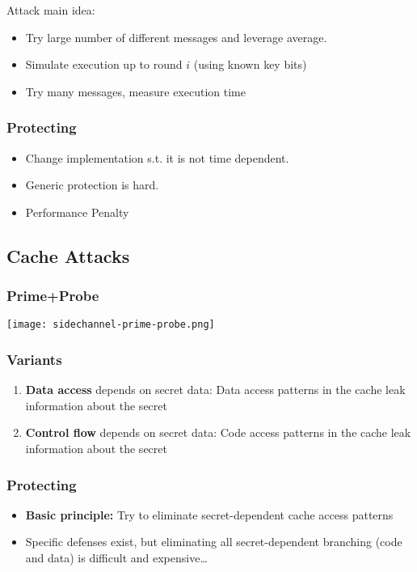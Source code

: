 Attack main idea:
\begin{itemize}
  \item Try large number of different messages and leverage average.
  \item Simulate execution up to round $i$ (using known key bits)
  \item Try many messages, measure execution time
\end{itemize}

\subsubsection{Protecting}
\begin{itemize}
  \item Change implementation s.t. it is not time dependent.
  \item Generic protection is hard.
  \item Performance Penalty
\end{itemize}

\subsection{Cache Attacks}
\subsubsection{Prime+Probe}
\texttt{[image: sidechannel-prime-probe.png]}
\subsubsection{Variants}
\begin{enumerate}
	\item \textbf{Data access} depends on secret data: Data access patterns
	  in the cache leak information about the secret
	\item \textbf{Control flow} depends on secret data: Code access
	  patterns in the cache leak information about the secret
\end{enumerate}
\subsubsection{Protecting}
\begin{itemize}
	\item \textbf{Basic principle:}
Try to eliminate secret-dependent cache access patterns
\item Specific defenses exist, but eliminating all secret-dependent
branching (code and data) is difficult and expensive…
\end{itemize}

